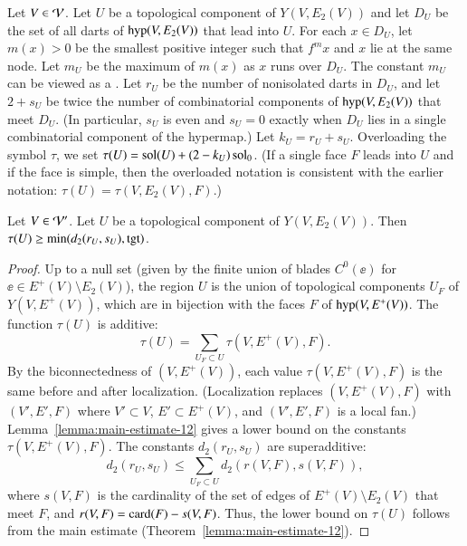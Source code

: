 \documentclass{llncs}
\def\op#1{{\hbox{#1}}}
\begin{document}
\begin{definition}[$D_U$,~$m_U$,~$r_U$,~$s_U$,~$k_U$,~$\tau(U)$]
  Let $V\in {\mathcal V}$.  Let $U$ be a topological component of
  $Y(V,E_2(V))$ and let $D_U$ be the set of all darts of $\op{hyp}(V,E_2(V))$
 that lead into
  $U$.   For each
  $x\in D_U$, let $m(x) >0$ be the smallest positive integer such that
  $f^{m} x$ and $x$ lie at the same node.  Let $m_U$ be the maximum of
  $m(x)$  as $x$ runs over $D_U$.  The constant $m_U$ can be viewed as
  a .  
Let $r_U$ be the number of nonisolated darts in $D_U$, and let $2+s_U$ be twice the
  number of combinatorial components of $\op{hyp}(V,E_2(V))$ that
  meet $D_U$.  (In particular, $s_U$ is even and $s_U=0$ exactly when $D_U$ lies in a 
single combinatorial component of the hypermap.)
Let $k_U=r_U+s_U$.  Overloading the symbol $\tau$, we
  set $\tau(U) = \operatorname{sol}(U) +  (2-k_U)\operatorname{sol}_0$.   (If a single  face $F$ leads into
  $U$ and if the face is simple, then the overloaded notation is consistent
with the earlier notation: $\tau(U) = \tau(V,E_2(V),F)$.)
%
\end{definition}

\begin{lemma}\label{lemma:tauU'}
  Let $V\in {\mathcal V}'$.
Let $U$ be a topological component of
  $Y(V,E_2(V))$.   Then $\tau(U)\ge \min(d_2(r_U,s_U),\op{tgt})$.
\end{lemma}

\begin{proof}
Up to a null set (given by the finite union of blades $C^0(\ee)$ for
$\ee\in E^+(V)\setminus E_2(V)$), the region $U$ is the union of topological
components $U_F$ of $Y(V,E^+(V))$, which are in bijection with the faces
$F$ of $\op{hyp}(V,E^+(V))$.  The function $\tau(U)$ is additive:
\begin{equation}\label{eqn:tau-additive}
\tau(U) = \sum_{U_F\subset U} \tau(V,E^+(V),F).
\end{equation}
By the biconnectedness of $(V,E^+(V))$, each value $\tau(V,E^+(V),F)$ is the
same before and after localization.  (Localization replaces $(V,E^+(V),F)$ with $(V',E',F)$
where $V'\subset V$, $E'\subset E^+(V)$, and $(V',E',F)$ is a local fan.)
Lemma~\ref{lemma:main-estimate-12} gives a lower bound on the
constants $\tau(V,E^+(V),F)$.  The constants $d_2(r_U,s_U)$ are superadditive:
\[
d_2(r_U,s_U) \le \sum_{U_F\subset U} d_2(r(V,F),s(V,F)),
\]
where $s(V,F)$ is the cardinality of the set of edges of $E^+(V)\setminus
E_2(V)$ that meet $F$, and $r(V,F) = \card(F)-s(V,F)$.  Thus, the 
lower bound on $\tau(U)$ follows from the main estimate
(Theorem~\ref{lemma:main-estimate-12}).
\end{proof}
\end{document}
